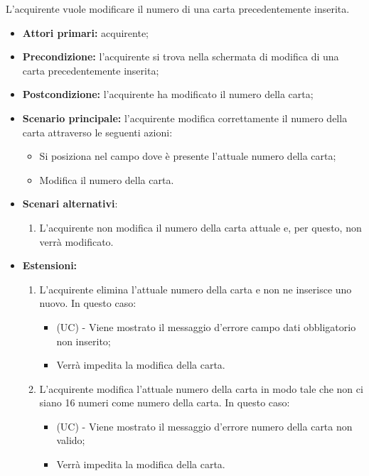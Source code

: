 L'acquirente vuole modificare il numero di una carta precedentemente inserita.
\begin{itemize}
    \item \textbf{Attori primari:} acquirente;
    \item \textbf{Precondizione:} l'acquirente si trova nella schermata di modifica di una carta precedentemente inserita;
    \item \textbf{Postcondizione:} l'acquirente ha modificato il numero della carta;
    \item \textbf{Scenario principale:} l'acquirente modifica correttamente il numero della carta attraverso le seguenti azioni:
    \begin{itemize}
        \item Si posiziona nel campo dove è presente l'attuale numero della carta;
        \item Modifica il numero della carta.
    \end{itemize}
    \item \textbf{Scenari alternativi}:
    \begin{enumerate}[label=\lett]
        \item L'acquirente non modifica il numero della carta attuale e, per questo, non verrà modificato.
    \end{enumerate}
    \item \textbf{Estensioni:}
    \begin{enumerate}[label=\lett]
        \item L'acquirente elimina l'attuale numero della carta e non ne inserisce uno nuovo. In questo caso:
        \begin{itemize}
            \item (UC) - Viene mostrato il messaggio d'errore campo dati obbligatorio non inserito;
            \item Verrà impedita la modifica della carta.
        \end{itemize}
        \item L'acquirente modifica l'attuale numero della carta in modo tale che non ci siano 16 numeri come numero della carta. In questo caso:
        \begin{itemize}
            \item (UC) - Viene mostrato il messaggio d'errore numero della carta non valido;
            \item Verrà impedita la modifica della carta.
        \end{itemize}
    \end{enumerate}
\end{itemize}

